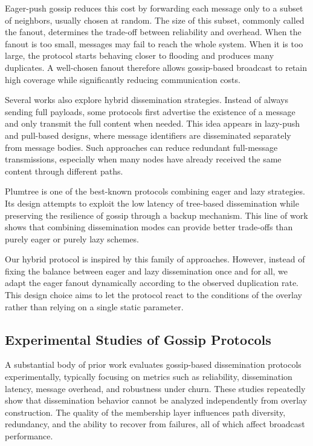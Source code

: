 \documentclass[sigconf,a4paper]{acmart}
\begin{document}
Eager-push gossip reduces this cost by forwarding each message only to a
subset of neighbors, usually chosen at random. The size of this subset,
commonly called the fanout, determines the trade-off between reliability
and overhead. When the fanout is too small, messages may fail to reach
the whole system. When it is too large, the protocol starts behaving
closer to flooding and produces many duplicates. A well-chosen fanout
therefore allows gossip-based broadcast to retain high coverage while
significantly reducing communication costs.

Several works also explore hybrid dissemination strategies. Instead of
always sending full payloads, some protocols first advertise the
existence of a message and only transmit the full content when needed.
This idea appears in lazy-push and pull-based designs, where message
identifiers are disseminated separately from message bodies. Such
approaches can reduce redundant full-message transmissions, especially
when many nodes have already received the same content through different
paths.

Plumtree is one of the best-known protocols combining eager and lazy
strategies. Its design attempts to exploit the low latency of tree-based
dissemination while preserving the resilience of gossip through a backup
mechanism. This line of work shows that combining dissemination modes
can provide better trade-offs than purely eager or purely lazy schemes.

Our hybrid protocol is inspired by this family of approaches. However,
instead of fixing the balance between eager and lazy dissemination once
and for all, we adapt the eager fanout dynamically according to the
observed duplication rate. This design choice aims to let the protocol
react to the conditions of the overlay rather than relying on a single
static parameter.

\subsection{Experimental Studies of Gossip Protocols}

A substantial body of prior work evaluates gossip-based dissemination
protocols experimentally, typically focusing on metrics such as
reliability, dissemination latency, message overhead, and robustness
under churn. These studies repeatedly show that dissemination behavior
cannot be analyzed independently from overlay construction. The quality
of the membership layer influences path diversity, redundancy, and the
ability to recover from failures, all of which affect broadcast
performance.
\end{document}
